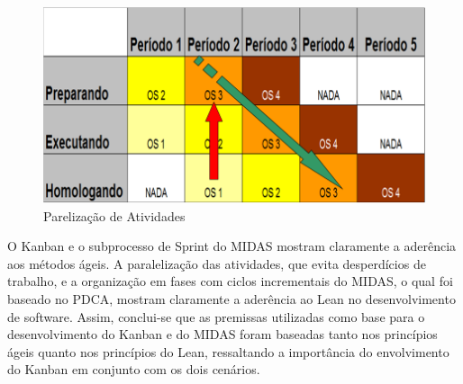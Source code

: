 \begin{figure}[h]
		\centering
		\label{fig09}
			\includegraphics[scale=0.6]{figuras/kanbanIPHAN5.png}
		\caption{Parelização de Atividades \cite{parente}}
\end{figure}

O Kanban e o subprocesso de Sprint do MIDAS mostram claramente a aderência aos métodos ágeis. A paralelização das atividades, que evita desperdícios de trabalho, e a organização em fases com ciclos incrementais do MIDAS, o qual foi baseado no PDCA, mostram claramente a aderência ao Lean no desenvolvimento de software. Assim, conclui-se que as premissas utilizadas como base para o desenvolvimento do Kanban e do MIDAS foram baseadas tanto nos princípios ágeis quanto nos princípios do Lean, ressaltando a importância do envolvimento do Kanban em conjunto com os dois cenários.